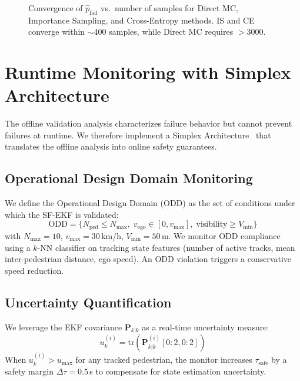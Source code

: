 \documentclass[conference]{IEEEtran}
\begin{document}
\begin{figure}[H]
    \centering
    
    \caption{Convergence of $\hat{p}_{\text{fail}}$ vs.\ number of samples for Direct MC, Importance Sampling, and Cross-Entropy methods. IS and CE converge within $\sim$400 samples, while Direct MC requires $>3000$.}
    \label{fig:is_convergence}
\end{figure}

\section{Runtime Monitoring with Simplex Architecture}
\label{sec:runtime}

The offline validation analysis characterizes failure behavior but cannot prevent failures at runtime. We therefore implement a Simplex Architecture~\cite{sha2001simplex, bak2014simplex} that translates the offline analysis into online safety guarantees.

\subsection{Operational Design Domain Monitoring}
\label{sec:odd}

We define the Operational Design Domain (ODD) as the set of conditions under which the SF-EKF is validated:
\begin{equation}
    \text{ODD} = \{N_{\text{ped}} \leq N_{\max},\; v_{\text{ego}} \in [0, v_{\max}],\; \text{visibility} \geq V_{\min}\}
\end{equation}
with $N_{\max} = 10$, $v_{\max} = 30$\,km/h, $V_{\min} = 50$\,m. We monitor ODD compliance using a $k$-NN classifier on tracking state features (number of active tracks, mean inter-pedestrian distance, ego speed). An ODD violation triggers a conservative speed reduction.

\subsection{Uncertainty Quantification}
\label{sec:uq}

We leverage the EKF covariance $\mathbf{P}_{k|k}$ as a real-time uncertainty measure:
\begin{equation}
    u_k^{(i)} = \mathrm{tr}\!\left(\mathbf{P}_{k|k}^{(i)}[0:2, 0:2]\right)
    \label{eq:uncertainty}
\end{equation}
When $u_k^{(i)} > u_{\max}$ for any tracked pedestrian, the monitor increases $\tau_{\text{safe}}$ by a safety margin $\Delta\tau = 0.5$\,s to compensate for state estimation uncertainty.
\end{document}
